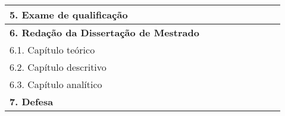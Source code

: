\begin{table}[H]
{\begin{tabular}{ll|l|l|l|l|l|l|l}
			\textbf{5. Exame de qualificação} &  &  &  &  &  &  & \cellcolor[HTML]{5076B0} &  \\ \hline
			\textbf{6. Redação da Dissertação de Mestrado} &  \multicolumn{8}{c}{}  \\ \hline
			6.1. Capítulo teórico &  &  &  & \cellcolor[HTML]{5076B0} & &  &  &  \\ \hline
			6.2. Capítulo descritivo &  &  &  &  & \cellcolor[HTML]{5076B0} & \cellcolor[HTML]{5076B0} &  &  \\ \hline
			6.3. Capítulo analítico &  &  &  &  & & \cellcolor[HTML]{5076B0} & \cellcolor[HTML]{5076B0} &  \\ \hline
			\textbf{7. Defesa} &  &  &  &  &  &  &  & \cellcolor[HTML]{5076B0} \\ \hline \hline
		\end{tabular}%
	\renewcommand{\arraystretch}{0.4}
	}
\end{table}




